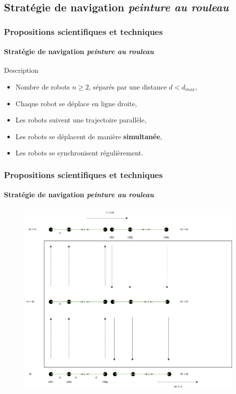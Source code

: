 \documentclass{beamer}
\begin{document}
		\subsection{Stratégie de navigation \textit{peinture au rouleau}}
			\begin{frame}
				\frametitle{Propositions scientifiques et techniques}
				\framesubtitle{Stratégie de navigation \textit{peinture au rouleau}}
				\begin{block}{Description}
					\begin{itemize}
						\item Nombre de robots $n \ge 2$, séparés par une distance $d < d_{max}$,
						\item Chaque robot se déplace en ligne droite,
						\item Les robots suivent une trajectoire parallèle,
						\item Les robots se déplacent de manière \textbf{simultanée},
						\item Les robots se synchronisent régulièrement.
					\end{itemize}
				\end{block}
			\end{frame}
			\begin{frame}
				\frametitle{Propositions scientifiques et techniques}
				\framesubtitle{Stratégie de navigation \textit{peinture au rouleau}}
				\begin{figure}
					\centering
					\includegraphics[width=0.7\linewidth]{graphics/peinture_au_rouleau.png}
				\end{figure}
			\end{frame}
\end{document}

